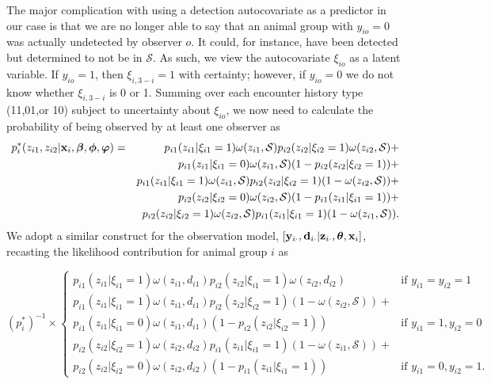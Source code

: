 \documentclass[12pt,fleqn]{article}
\begin{document}
The major complication with using a detection autocovariate as a predictor in our case is that we are no longer able to say that an animal group with $y_{io}=0$ was actually undetected by observer $o$.  It could, for instance, have been detected but determined to not be in $\mathcal{S}$.  As such, we view the autocovariate $\xi_{io}$ as a latent variable.  If $y_{io}=1$, then $\xi_{i,3-i}=1$ with certainty; however, if $y_{io}=0$ we do not know whether $\xi_{i,3-i}$ is 0 or 1. Summing over each encounter history type (11,01,or 10) subject to uncertainty about $\xi_{io}$, we now need to calculate the probability of being observed by at least one observer as
\begin{eqnarray}
  \label{eq:pstar2}
  p_i^*(z_{i1},z_{i2}|{\bf x}_i,\boldsymbol{\beta},\boldsymbol{\phi},\boldsymbol{\varphi}) & = &
  p_{i1}(z_{i1}|\xi_{i1}=1) \omega(z_{i1},\mathcal{S}) p_{i2}(z_{i2}|\xi_{i2}=1) \omega(z_{i2},\mathcal{S}) + \\
   & & p_{i1}(z_{i1}|\xi_{i1}=0)\omega(z_{i1},\mathcal{S})(1-p_{i2}(z_{i2}|\xi_{i2}=1)) + \nonumber \\ & &
   p_{i1}(z_{i1}|\xi_{i1}=1)\omega(z_{i1},\mathcal{S})p_{i2}(z_{i2}|\xi_{i2}=1)(1-\omega(z_{i2},\mathcal{S}))
   + \nonumber \\ & &
    p_{i2}(z_{i2}|\xi_{i2}=0)\omega(z_{i2},\mathcal{S})(1-p_{i1}(z_{i1}|\xi_{i1}=1)) + \nonumber \\ & &
   p_{i2}(z_{i2}|\xi_{i2}=1)\omega(z_{i2},\mathcal{S})p_{i1}(z_{i1}|\xi_{i1}=1)(1-\omega(z_{i1},\mathcal{S})).
   \nonumber
\end{eqnarray}
We adopt a similar construct for the observation model, $[{\bf y}_{i \cdot},{\bf d}_{i \cdot}|{\bf z}_{i \cdot} , \boldsymbol{\theta} , {\bf x}_i]$, recasting the likelihood contribution for animal group $i$ as
\begin{linenomath}
\begin{equation}
    \label{eq:obsmod2}
    (p_i^*)^{-1} \times  \left\{ \begin{array}{ll}
    p_{i1}(z_{i1}|\xi_{i1}=1) \omega(z_{i1},d_{i1}) p_{i2}(z_{i2}|\xi_{i1}=1) \omega(z_{i2},d_{i2}) & \text{if }y_{i1}=y_{i2}=1 \\
    p_{i1}(z_{i1}|\xi_{i1}=1)\omega(z_{i1},d_{i1})
    p_{i2}(z_{i2}|\xi_{i2}=1)(1-\omega(z_{i2},\mathcal{S}))+ &  \\
    p_{i1}(z_{i1}|\xi_{i1}=0)\omega(z_{i1},d_{i1})(1-p_{i2}(z_{i2}|\xi_{i2}=1))  & \text{if } y_{i1}=1, y_{i2}=0 \\
    p_{i2}(z_{i2}|\xi_{i2}=1)\omega(z_{i2},d_{i2})
    p_{i1}(z_{i1}|\xi_{i1}=1)(1-\omega(z_{i1},\mathcal{S}))+ &  \\
    p_{i2}(z_{i2}|\xi_{i2}=0)\omega(z_{i2},d_{i2})(1-p_{i1}(z_{i1}|\xi_{i1}=1)) & \text{if } y_{i1}=0, y_{i2}=1 . \end{array} \right.
\end{equation}
\end{linenomath}
\end{document}
